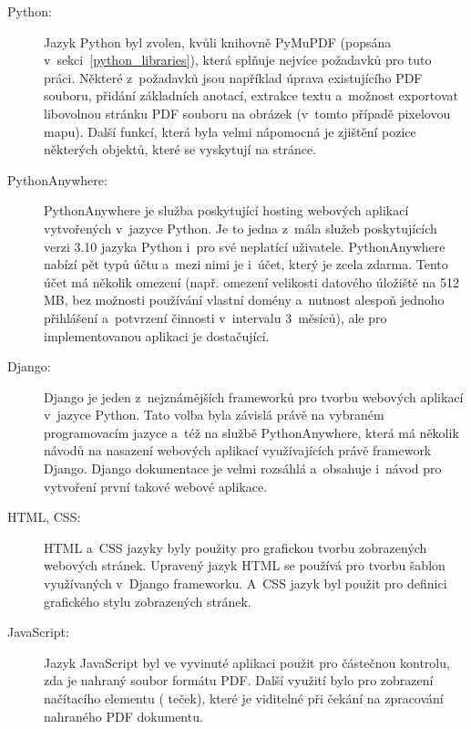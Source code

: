 \begin{description}
    \item[Python:] Jazyk Python byl zvolen, kvůli knihovně PyMuPDF
    (popsána v~sekci~\ref{python_libraries}), která splňuje nejvíce požadavků
    pro tuto práci. Některé z~požadavků jsou například úprava existujícího PDF
    souboru, přidání základních anotací, extrakce textu a~možnost exportovat
    libovolnou stránku PDF souboru na obrázek (v~tomto případě pixelovou mapu).
    Další funkcí, která byla velmi nápomocná je zjištění pozice některých
    objektů, které se vyskytují na stránce.

    \item[PythonAnywhere:] PythonAnywhere je služba poskytující hosting webových
    aplikací vytvořených v~jazyce Python. Je to jedna z~mála služeb poskytujících
    verzi 3.10 jazyka Python i~pro své neplatící uživatele. PythonAnywhere
    nabízí pět typů účtu a~mezi nimi je i~účet, který je zcela zdarma. Tento
    účet má několik omezení (např. omezení velikosti datového úložiště na
    512\,MB, bez možnosti používání vlastní domény a~nutnost alespoň jednoho
    přihlášení a~potvrzení činnosti v~intervalu 3~měsíců), ale pro
    implementovanou aplikaci je dostačující.

    \item[Django:] Django je jeden z~nejznámějších frameworků pro tvorbu webových
    aplikací v~jazyce Python. Tato volba byla závislá právě na vybraném
    programovacím jazyce a~též na službě PythonAnywhere, která má několik
    návodů na nasazení webových aplikací využívajících právě framework Django.
    Django dokumentace je velmi rozsáhlá a~obsahuje i~návod pro vytvoření
    první takové webové aplikace.
    
    \item[HTML, CSS:] HTML a~CSS jazyky byly použity pro grafickou tvorbu
    zobrazených webových stránek. Upravený jazyk HTML se používá pro tvorbu
    šablon využívaných v~Django frameworku. A~CSS jazyk byl použit pro
    definici grafického stylu zobrazených stránek.
    
    \item[JavaScript:] Jazyk JavaScript byl ve vyvinuté aplikaci použit pro
    částečnou kontrolu, zda je nahraný soubor formátu PDF. Další využití
    bylo pro zobrazení načítacího elementu ( teček),
    které je viditelné při čekání na zpracování nahraného PDF dokumentu.
    
\end{description}



